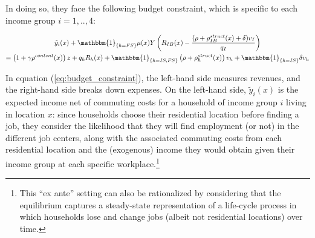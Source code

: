 \documentclass[12pt]{article}
\begin{document}
In doing so, they face the following budget constraint, which is specific to each income group $i=1,..,4$:

\begin{multline}
\label{eq:budget_constraint}
   \tilde{y}_i(x) + \mathbbm{1}_{\{h=FS\}} \mu(x)Y \left (R_{IB}(x) - \frac{(\rho + \rho_{IB}^{struct}(x) +\delta)v_{I}}{q_{I}} \right )\\ = \left(1 + \gamma \rho^{content}(x)\right)z + q_{h}R_{h}(x) + \mathbbm{1}_{\{h = IS,FS\}} \left( \rho + \rho_{h}^{struct}(x) \right)v_{h} + \mathbbm{1}_{\{h = IS\}} \delta v_{h}    
\end{multline}

In equation (\ref{eq:budget_constraint}), the left-hand side measures revenues, and the right-hand side breaks down expenses. On the left-hand side, $\tilde{y}_i(x)$ is the expected income net of commuting costs for a household of income group $i$ living in location $x$: since households choose their residential location before finding a job, they consider the likelihood that they will find employment (or not) in the different job centers, along with the associated commuting costs from each residential location and the (exogenous) income they would obtain given their income group at each specific workplace.\footnote{This ``ex ante'' setting can also be rationalized by considering that the equilibrium captures a steady-state representation of a life-cycle process in which households lose and change jobs (albeit not residential locations) over time. }
\end{document}
